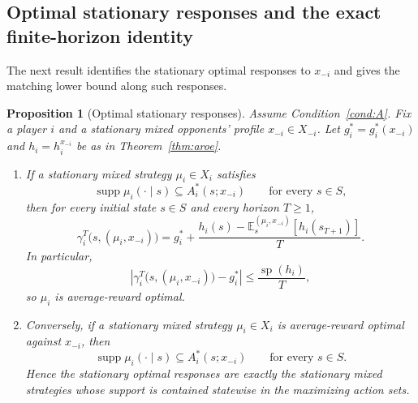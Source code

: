\documentclass[11pt]{article}
\newtheorem{proposition}[theorem]{Proposition}
\theoremstyle{definition}
\newcommand{\E}{\mathbb{E}}
\newcommand{\1}{\mathbf{1}}
\DeclareMathOperator{\spn}{sp}
\DeclareMathOperator{\supp}{supp}
\begin{document}
\subsection{Optimal stationary responses and the exact finite-horizon identity}

The next result identifies the stationary optimal responses to $x_{-i}$ and gives the matching lower bound along such responses.

\begin{proposition}[Optimal stationary responses]\label{prop:optimal-stationary}
Assume Condition~\ref{cond:A}. Fix a player $i$ and a stationary mixed opponents' profile $x_{-i}\in X_{-i}$. Let $g_i^*=g_i^*(x_{-i})$ and $h_i=h_i^{x_{-i}}$ be as in Theorem~\ref{thm:aroe}.

\begin{enumerate}[label=\textup{(\alph*)},leftmargin=2.4em]
\item If a stationary mixed strategy $\mu_i\in X_i$ satisfies
\[
\supp \mu_i(\cdot\mid s)\subseteq A_i^*(s;x_{-i})\qquad\text{for every }s\in S,
\]
then for every initial state $s\in S$ and every horizon $T\ge1$,
\begin{equation}\label{eq:exact-identity}
\gamma_i^T\bigl(s,(\mu_i,x_{-i})\bigr)
= g_i^*+\frac{h_i(s)-\E_s^{(\mu_i,x_{-i})}[h_i(s_{T+1})]}{T}.
\end{equation}
In particular,
\begin{equation}\label{eq:exact-lower-bound}
\left|\gamma_i^T\bigl(s,(\mu_i,x_{-i})\bigr)-g_i^*\right|\le \frac{\spn(h_i)}{T},
\end{equation}
so $\mu_i$ is average-reward optimal.

\item Conversely, if a stationary mixed strategy $\mu_i\in X_i$ is average-reward optimal against $x_{-i}$, then
\[
\supp \mu_i(\cdot\mid s)\subseteq A_i^*(s;x_{-i})\qquad\text{for every }s\in S.
\]
Hence the stationary optimal responses are exactly the stationary mixed strategies whose support is contained statewise in the maximizing action sets.
\end{enumerate}
\end{proposition}
\end{document}
